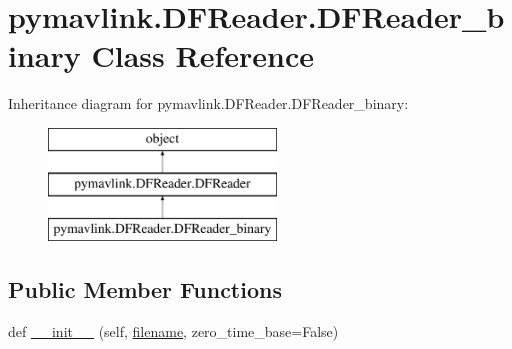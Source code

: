 \hypertarget{classpymavlink_1_1DFReader_1_1DFReader__binary}{}\section{pymavlink.\+D\+F\+Reader.\+D\+F\+Reader\+\_\+binary Class Reference}
\label{classpymavlink_1_1DFReader_1_1DFReader__binary}
Inheritance diagram for pymavlink.\+D\+F\+Reader.\+D\+F\+Reader\+\_\+binary\+:\begin{figure}[H]
\begin{center}
\leavevmode
\includegraphics[height=3.000000cm]{classpymavlink_1_1DFReader_1_1DFReader__binary}
\end{center}
\end{figure}
\subsection*{Public Member Functions}
\begin{DoxyCompactItemize}
\item 
def \mbox{\hyperlink{classpymavlink_1_1DFReader_1_1DFReader__binary_ac46a1c2d0b542bf8a571362f5d91840d}{\+\_\+\+\_\+init\+\_\+\+\_\+}} (self, \mbox{\hyperlink{namespacepymavlink_1_1DFReader_a9653e10b2651c68cf8b171d8dd60f10c}{filename}}, zero\+\_\+time\+\_\+base=False)
\end{DoxyCompactItemize}
